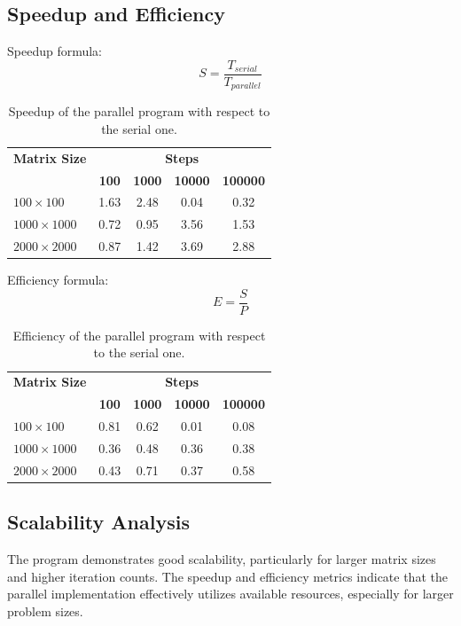 \documentclass[12pt]{article}
\begin{document}
\newpage
\subsection{Speedup and Efficiency}
Speedup formula:
\begin{equation}
	S = \frac{T_{serial}}{T_{parallel}}
\end{equation}

\begin{table}[h!]
	\centering
	\begin{tabular}{lcccc}
		\hline
		\textbf{Matrix Size} & \multicolumn{4}{c}{\textbf{Steps}}                                                    \\
		\cline{2-5}
		                     & \textbf{100}                       & \textbf{1000} & \textbf{10000} & \textbf{100000} \\
		\hline
		$100\times 100$      & 1.63                               & 2.48          & 0.04           & 0.32            \\
		$1000\times 1000$    & 0.72                               & 0.95          & 3.56           & 1.53            \\
		$2000\times 2000$    & 0.87                               & 1.42          & 3.69           & 2.88            \\
		\hline
	\end{tabular}
	\caption{Speedup of the parallel program with respect to the serial one.}
	\label{tab:speedup}
\end{table}

Efficiency formula:
\begin{equation}
	E = \frac{S}{P}
\end{equation}

\begin{table}[h!]
	\centering
	\begin{tabular}{lcccc}
		\hline
		\textbf{Matrix Size} & \multicolumn{4}{c}{\textbf{Steps}}                                                    \\
		\cline{2-5}
		                     & \textbf{100}                       & \textbf{1000} & \textbf{10000} & \textbf{100000} \\
		\hline
		$100\times 100$      & 0.81                               & 0.62          & 0.01           & 0.08            \\
		$1000\times 1000$    & 0.36                               & 0.48          & 0.36           & 0.38            \\
		$2000\times 2000$    & 0.43                               & 0.71          & 0.37           & 0.58            \\
		\hline
	\end{tabular}
	\caption{Efficiency of the parallel program with respect to the serial one.}
	\label{tab:efficiency}
\end{table}

\subsection{Scalability Analysis}
The program demonstrates good scalability, particularly for larger matrix sizes and higher iteration counts. The speedup and efficiency metrics indicate that the parallel implementation effectively utilizes available resources, especially for larger problem sizes.
\end{document}
